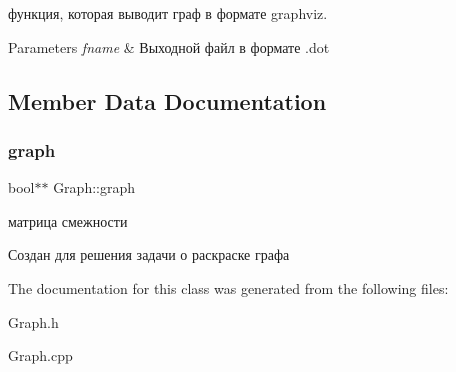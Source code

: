 функция, которая выводит граф в формате graphviz. 


\begin{DoxyParams}{Parameters}
{\em fname} & Выходной файл в формате .dot \\
\hline
\end{DoxyParams}


\subsection{Member Data Documentation}
\mbox{\label{class_graph_a11d8c4f9e352a53522578b7d121b4c2c}} 
\subsubsection{\texorpdfstring{graph}{graph}}
{\footnotesize\ttfamily bool$\ast$$\ast$ Graph\+::graph}



матрица смежности 

Создан для решения задачи о раскраске графа 

The documentation for this class was generated from the following files\+:\begin{DoxyCompactItemize}
\item 
Graph.\+h\item 
Graph.\+cpp\end{DoxyCompactItemize}
